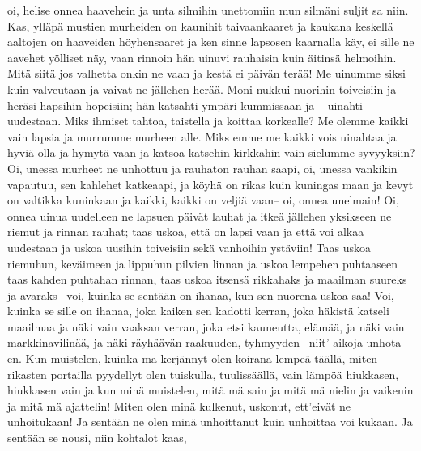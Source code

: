     oi, helise onnea haavehein
    ja unta silmihin unettomiin
    mun silmäni suljit sa niin.
    Kas, ylläpä mustien murheiden
    on kaunihit taivaankaaret
    ja kaukana keskellä aaltojen
    on haaveiden höyhensaaret
    ja ken sinne lapsosen kaarnalla käy,
    ei sille ne aavehet yölliset näy,
    vaan rinnoin hän uinuvi rauhaisin
    kuin äitinsä helmoihin.
  \endverse
  \beginverse
    Mitä siitä jos valhetta onkin ne vaan
    ja kestä ei päivän terää!
    Me uinumme siksi kuin valveutaan
    ja vaivat ne jällehen herää.
    Moni nukkui nuorihin toiveisiin
    ja heräsi hapsihin hopeisiin;
    hän katsahti ympäri kummissaan
    ja -- uinahti uudestaan.
    Miks ihmiset tahtoa, taistella
    ja koittaa korkealle?
    Me olemme kaikki vain lapsia
    ja murrumme murheen alle.
    Miks emme me kaikki vois uinahtaa
    ja hyviä olla ja hymytä vaan
    ja katsoa katsehin kirkkahin
    vain sielumme syvyyksiin?
  \endverse
  \beginverse
    Oi, unessa murheet ne unhottuu
    ja rauhaton rauhan saapi,
    oi, unessa vankikin vapautuu,
    sen kahlehet katkeaapi,
    ja köyhä on rikas kuin kuningas maan
    ja kevyt on valtikka kuninkaan
    ja kaikki, kaikki on veljiä vaan--
    oi, onnea unelmain!
  \endverse
  \beginverse
    Oi, onnea uinua uudelleen
    ne lapsuen päivät lauhat
    ja itkeä jällehen yksikseen
    ne riemut ja rinnan rauhat;
    taas uskoa, että on lapsi vaan
    ja että voi alkaa uudestaan
    ja uskoa uusihin toiveisiin
    sekä vanhoihin ystäviin!
  \endverse
  \beginverse
    Taas uskoa riemuhun, keväimeen
    ja lippuhun pilvien linnan
    ja uskoa lempehen puhtaaseen
    taas kahden puhtahan rinnan,
    taas uskoa itsensä rikkahaks
    ja maailman suureks ja avaraks--
    voi, kuinka se sentään on ihanaa,
    kun sen nuorena uskoa saa!
  \endverse
  \beginverse
    Voi, kuinka se sille on ihanaa,
    joka kaiken sen kadotti kerran,
    joka häkistä katseli maailmaa
    ja näki vain vaaksan verran,
    joka etsi kauneutta, elämää,
    ja näki vain markkinavilinää,
    ja näki räyhäävän raakuuden, tyhmyyden--
    niit' aikoja unhota en.
  \endverse
  \beginverse
    Kun muistelen, kuinka ma kerjännyt
    olen koirana lempeä täällä,
    miten rikasten portailla pyydellyt
    olen tuiskulla, tuulissäällä,
    vain lämpöä hiukkasen, hiukkasen vain
    ja kun minä muistelen, mitä mä sain
    ja mitä mä nielin ja vaikenin
    ja mitä mä ajattelin!
  \endverse
  \beginverse
    Miten olen minä kulkenut, uskonut,
    ett'eivät ne unhoitukaan!
    Ja sentään ne olen minä unhoittanut
    kuin unhoittaa voi kukaan.
    Ja sentään se nousi, niin kohtalot kaas,
